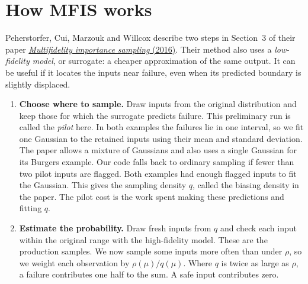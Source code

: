 \documentclass[11pt,a4paper]{article}
\begin{document}
\section{How MFIS works}
Peherstorfer, Cui, Marzouk and Willcox describe two steps in Section~3 of their paper \href{https://doi.org/10.1016/j.cma.2015.12.002}{\emph{Multifidelity importance sampling} (2016)}.
Their method also uses a \emph{low-fidelity model}, or surrogate: a cheaper approximation of the same output. It can be useful if it locates the inputs near failure, even when its predicted boundary is slightly displaced.
\begin{enumerate}
\item \textbf{Choose where to sample.} Draw inputs from the original distribution and keep those for which the surrogate predicts failure. This preliminary run is called the \emph{pilot} here. In both examples the failures lie in one interval, so we fit one Gaussian to the retained inputs using their mean and standard deviation. The paper allows a mixture of Gaussians and also uses a single Gaussian for its Burgers example. Our code falls back to ordinary sampling if fewer than two pilot inputs are flagged. Both examples had enough flagged inputs to fit the Gaussian. This gives the sampling density $q$, called the biasing density in the paper. The pilot cost is the work spent making these predictions and fitting $q$.
\item \textbf{Estimate the probability.} Draw fresh inputs from $q$ and check each input within the original range with the high-fidelity model. These are the production samples. We now sample some inputs more often than under $\rho$, so we weight each observation by $\rho(\mu)/q(\mu)$. Where $q$ is twice as large as $\rho$, a failure contributes one half to the sum. A safe input contributes zero.
\end{enumerate}
\end{document}
